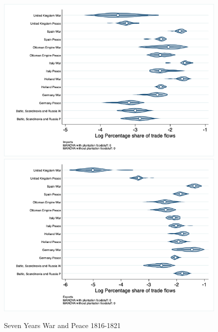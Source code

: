 \documentclass[12pt,a4paper,notitlepage,english]{article}
\begin{document}
\begin{appendix}
\begin{figure}[h!]
\centering
\caption{Seven Years War and Peace 1816-1821}
\label{seven_peace1764_1777_nat_distr_pays7}
\includegraphics[scale=.4]{seven_peace1764_1777_nat_distr_Ipays7}
\includegraphics[scale=.4]{seven_peace1764_1777_nat_distr_Xpays7}
\end{figure}


\end{appendix}
\end{document}
